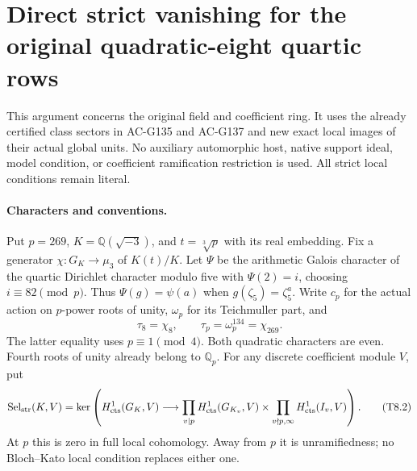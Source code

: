\section{Direct strict vanishing for the original quadratic-eight quartic rows}
\label{sec:cubic-tau8-strict-vanishing}

This argument concerns the original field and coefficient ring.  It uses
the already certified class sectors in AC-G135 and AC-G137 and new exact
local images of their actual global units.  No auxiliary automorphic
host, native support ideal, model condition, or coefficient ramification
restriction is used.  All strict local conditions remain literal.

\paragraph{Characters and conventions.}
Put $p=269$, $K=\mathbb Q(\sqrt{-3})$, and $t=\sqrt[3]{p}$ with its
real embedding.  Fix a generator $\chi:G_K\to\mu_3$ of $K(t)/K$.
Let $\Psi$ be the arithmetic Galois character of the quartic Dirichlet
character modulo five with $\Psi(2)=i$, choosing $i\equiv82\pmod p$.
Thus $\Psi(g)=\psi(a)$ when $g(\zeta_5)=\zeta_5^a$.
Write $c_p$ for the actual action on $p$-power roots of unity,
$\omega_p$ for its Teichmuller part, and
\[
 \tau_8=\chi_8,\qquad \tau_p=\omega_p^{134}=\chi_{269}.
 \tag{T8.1}
\]
The latter equality uses $p\equiv1\pmod4$.  Both quadratic characters
are even.  Fourth roots of unity already belong to $\mathbb Q_p$.
For any discrete coefficient module $V$, put
\[
 \operatorname{Sel}_{\rm str}(K,V)=\ker\left(
 H^1_{\rm cts}(G_K,V)\longrightarrow
 \prod_{v\mid p}H^1_{\rm cts}(G_{K_v},V)
 \times\prod_{v\nmid p,\infty}H^1_{\rm cts}(I_v,V)\right).
 \tag{T8.2}
\]
At $p$ this is zero in full local cohomology.  Away from $p$ it is
unramifiedness; no Bloch--Kato local condition replaces either one.


